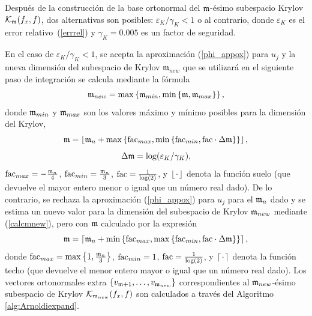 Después de la construcción de la base ortonormal del $\mathfrak{m}$-ésimo subespacio Krylov $\mathcal{K}_{\mathfrak{m}}(f_x,f)$, dos alternativas son posibles: $\varepsilon_{K}/\gamma_{K}< 1$ o al contrario, donde $\varepsilon_{K}$
es el error relativo~(\ref{errrel}) y $\gamma_{K}=0.005$ es un factor de seguridad.

En el caso de $\varepsilon_{K}/\gamma_{K}< 1$, se acepta la aproximación (\ref{phi_appox}) para $u_j$ y la nueva dimensión del subespacio de Krylov $\mathfrak{m}_{new}$ que se utilizará en el siguiente paso de integración se calcula mediante la fórmula
\begin{equation}\label{calcmnew}
    \mathfrak{m}_{new}= \max\left\{ \mathfrak{m}_{min}, \min\left\{ \mathfrak{m} , \mathfrak{m}_{max}  \right\} \right\},
\end{equation}
    donde $\mathfrak{m}_{min}$ y $\mathfrak{m}_{max}$ son los valores máximo y mínimo posibles para la dimensión del Krylov,
\begin{equation*}
    \mathfrak{m} = \left\lfloor \mathfrak{m}_{n} + \max\left\{ \mathrm{fac}_{max} , \min\left\{ \mathrm{fac}_{min},
            \mathrm{fac}\cdot\Delta\mathfrak{m} \right\}  \right\} \right\rfloor,
\end{equation*}
\begin{equation}
    \Delta\mathfrak{m}=\log(\varepsilon_{K}/\gamma_{K}), \label{delta_m}
\end{equation}
$\mathrm{fac}_{max}= -\frac{\mathfrak{m}_n}{4}$, $\mathrm{fac}_{min}= \frac{\mathfrak{m}_n}{3}$, $\mathrm{fac}=\frac{1}{\log( 2)}$, y $\left\lfloor \cdot \right\rfloor$ denota la función suelo (que devuelve el mayor entero menor o igual que un número real dado). De lo contrario, se rechaza la aproximación (\ref{phi_appox}) para $u_j$ para el $\mathfrak{m}_n$ dado y se estima un nuevo valor para la dimensión del subespacio de Krylov $\mathfrak{m}_{new}$ mediante (\ref{calcmnew}), pero con $\mathfrak{m}$ calculado por la expresión
\begin{equation*}
    \mathfrak{m} = \left\lceil \mathfrak{m}_{n} + \min\left\{ \mathrm{fac}_{max} , \max\left\{ \mathrm{fac}_{min},
            \mathrm{fac}\cdot\Delta\mathfrak{m} \right\}  \right\} \right\rceil,
\end{equation*}
donde $\mathrm{fac}_{max}= \max\left\{  1,\frac{\mathfrak{m}_{n}}{3}  \right\}$, $\mathrm{fac}_{min}= 1 $, $\mathrm{fac}=\frac{1}{\log (2)}$, y $\left\lceil \cdot \right\rceil$ denota la función techo (que devuelve el menor entero mayor o igual que un número real dado). Los vectores ortonormales extra $\{v_{\mathfrak{m}+1},\ldots,v_{\mathfrak{m}_{new}} \}$ correspondientes al $\mathfrak{m}_{new}$-ésimo subespacio de Krylov $\mathcal{K}_{\mathfrak{m}_{new}}(f_x,f)$ son calculados a través del Algoritmo \ref{alg:Arnoldiexpand}.

